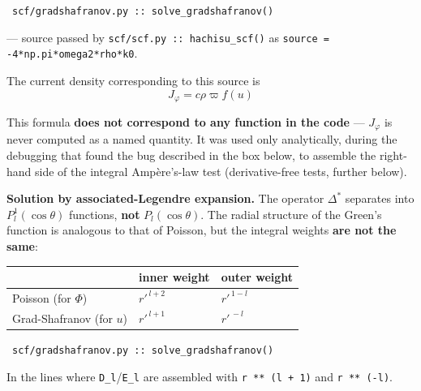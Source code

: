 \documentclass[11pt,a4paper]{scrartcl}
\newcommand{\arrowto}[1]{%
  \par\vspace{2pt}\noindent{\color{linkblue}$\rightarrow$}~\texttt{\small #1}\par\vspace{2pt}}
\newcommand{\code}[1]{\texttt{\small #1}}
\begin{document}
\arrowto{scf/gradshafranov.py :: solve\_gradshafranov()} --- source passed by \code{scf/scf.py :: hachisu\_scf()} as \code{source = -4*np.pi*omega2*rho*k0}.

The current density corresponding to this source is
\begin{equation}
J_\varphi = c\rho\varpi f(u)
\end{equation}

This formula \textbf{does not correspond to any function in the code} ---
$J_\varphi$ is never computed as a named quantity. It was used only
analytically, during the debugging that found the bug described in the
box below, to assemble the right-hand side of the integral Ampère's-law
test (derivative-free tests, further below).

\textbf{Solution by associated-Legendre expansion.} The operator
$\Delta^*$ separates into $P_l^1(\cos\theta)$ functions, \textbf{not}
$P_l(\cos\theta)$. The radial structure of the Green's function is
analogous to that of Poisson, but the integral weights \textbf{are not
the same}:

\begin{center}
\begin{tabular}{@{}lll@{}}
\toprule
& inner weight & outer weight\\
\midrule
Poisson (for $\Phi$) & $r'^{\,l+2}$ & $r'^{\,1-l}$\\
Grad-Shafranov (for $u$) & $r'^{\,l+1}$ & $r'^{\,-l}$\\
\bottomrule
\end{tabular}
\end{center}

\arrowto{scf/gradshafranov.py :: solve\_gradshafranov()}

In the lines where \code{D\_l}/\code{E\_l} are assembled with \code{r ** (l + 1)} and \code{r ** (-l)}.
\end{document}
